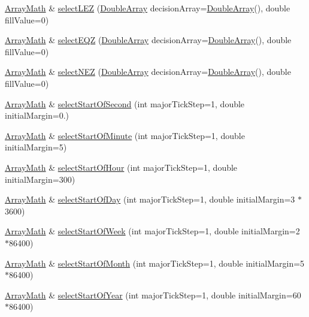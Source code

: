 \begin{DoxyCompactItemize}
\item 
\hyperlink{class_array_math}{Array\+Math} \& \hyperlink{class_array_math_a63ec8c97034104b0ede0227683583eac}{select\+L\+EZ} (\hyperlink{class_double_array}{Double\+Array} decision\+Array=\hyperlink{class_double_array}{Double\+Array}(), double fill\+Value=0)
\item 
\hyperlink{class_array_math}{Array\+Math} \& \hyperlink{class_array_math_a7c219ae5049b2a515025f24ae5428a83}{select\+E\+QZ} (\hyperlink{class_double_array}{Double\+Array} decision\+Array=\hyperlink{class_double_array}{Double\+Array}(), double fill\+Value=0)
\item 
\hyperlink{class_array_math}{Array\+Math} \& \hyperlink{class_array_math_a0ec9ff9be8d0f829ba79bd1a53a791a5}{select\+N\+EZ} (\hyperlink{class_double_array}{Double\+Array} decision\+Array=\hyperlink{class_double_array}{Double\+Array}(), double fill\+Value=0)
\item 
\hyperlink{class_array_math}{Array\+Math} \& \hyperlink{class_array_math_ab0253df48686370fccc34f3e286521d9}{select\+Start\+Of\+Second} (int major\+Tick\+Step=1, double initial\+Margin=0.)
\item 
\hyperlink{class_array_math}{Array\+Math} \& \hyperlink{class_array_math_a56f6e1b492180694a2117d030858a41a}{select\+Start\+Of\+Minute} (int major\+Tick\+Step=1, double initial\+Margin=5)
\item 
\hyperlink{class_array_math}{Array\+Math} \& \hyperlink{class_array_math_a39fc6c03bb738f82e4f98daebb672dda}{select\+Start\+Of\+Hour} (int major\+Tick\+Step=1, double initial\+Margin=300)
\item 
\hyperlink{class_array_math}{Array\+Math} \& \hyperlink{class_array_math_a5e6c8318cbc69a3bb9da3c1c0ca86c26}{select\+Start\+Of\+Day} (int major\+Tick\+Step=1, double initial\+Margin=3 $\ast$3600)
\item 
\hyperlink{class_array_math}{Array\+Math} \& \hyperlink{class_array_math_a97c624b2c158da5bcea887bec88d8fd0}{select\+Start\+Of\+Week} (int major\+Tick\+Step=1, double initial\+Margin=2 $\ast$86400)
\item 
\hyperlink{class_array_math}{Array\+Math} \& \hyperlink{class_array_math_a65c725e8229a4cba8072af77b23e2286}{select\+Start\+Of\+Month} (int major\+Tick\+Step=1, double initial\+Margin=5 $\ast$86400)
\item 
\hyperlink{class_array_math}{Array\+Math} \& \hyperlink{class_array_math_a49a76a80a68b10357db7f0189e3bfb2f}{select\+Start\+Of\+Year} (int major\+Tick\+Step=1, double initial\+Margin=60 $\ast$86400)
\item 

\end{DoxyCompactItemize}

